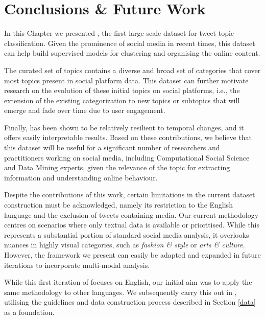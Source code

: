 \section{Conclusions \& Future Work}
In this Chapter we presented {\TweetTopic}, the first large-scale dataset for tweet topic classification. Given the prominence of social media in recent times, this dataset can help build supervised models for clustering and organising the online content. 

The curated set of topics contains a diverse and broad set of categories that cover most topics present in social platform data. This dataset can further motivate research on the evolution of these initial topics on social platforms, i.e., the extension of the existing categorization to new topics or subtopics that will emerge and fade over time due to user engagement. 

Finally, {\TweetTopic} has been shown to be relatively resilient to temporal changes, and it offers easily interpretable results. Based on these contributions, we believe that this dataset will be useful for a significant number of researchers and practitioners working on social media, including Computational Social Science and Data Mining experts, given the relevance of the topic for extracting information and understanding online behaviour.

Despite the contributions of this work, certain limitations in the current dataset construction must be acknowledged, namely its restriction to the English language and the exclusion of tweets containing media. Our current methodology centres on scenarios where only textual data is available or prioritised. While this represents a substantial portion of standard social media analysis, it overlooks nuances in highly visual categories, such as \textit{fashion \& style} or \textit{arts \& culture}. However, the framework we present can easily be adapted and expanded in future iterations to incorporate multi-modal analysis.

While this first iteration of {\TweetTopic} focuses on English, our initial aim was to apply the same methodology to other languages. We subsequently carry this out in , utilising the guidelines and data construction process described in Section \ref{data} as a foundation.



